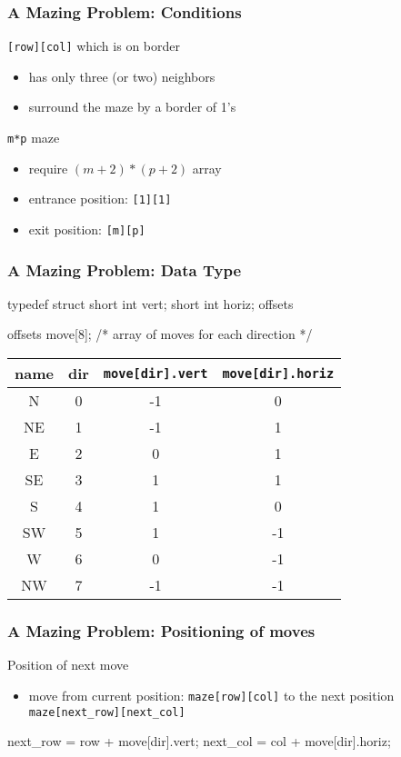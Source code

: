 \documentclass[newPxFont,sthlmFooter,nooffset]{beamer}
\begin{document}
\begin{frame}[t]
  \frametitle{A Mazing Problem: Conditions}
\texttt{[row][col]} which is on border
\begin{itemize}
\item has only three (or two) neighbors
\item surround the maze by a border of 1's
\end{itemize}

\bigskip
\texttt{m*p} maze
\begin{itemize}
\item require $(m+2) *(p+2)$ array
\item entrance position: \texttt{[1][1]}
\item exit position: \texttt{[m][p]}
\end{itemize}
\end{frame}

\begin{frame}[t, fragile]
  \frametitle{A Mazing Problem: Data Type}
\begin{ncodedef}
typedef struct {
    short int vert;
    short int horiz;
} offsets

offsets move[8]; /* array of moves for each direction */    
\end{ncodedef}

\begin{tabular}{c | c | c | c}
  name & dir & \texttt{move[dir].vert} & \texttt{move[dir].horiz} \\ \hline
N  &  0 & -1 &  0 \\
NE &  1 & -1 &  1 \\
E  &  2 &  0 &  1 \\
SE &  3 &  1 &  1 \\
S  &  4 &  1 &  0 \\
SW &  5 &  1 &  -1 \\
W  &  6 &  0 &  -1 \\
NW &  7 & -1 &  -1 \\
\end{tabular}
\end{frame}

\begin{frame}[t, fragile]
  \frametitle{A Mazing Problem: Positioning of moves}
Position of next move
\begin{itemize}
\item move from current position: \texttt{maze[row][col]} to the next position \texttt{maze[next\_row][next\_col]}
\end{itemize}
\begin{ncodedef}
next_row = row + move[dir].vert;
next_col = col + move[dir].horiz;
\end{ncodedef}
\end{frame}
\end{document}
